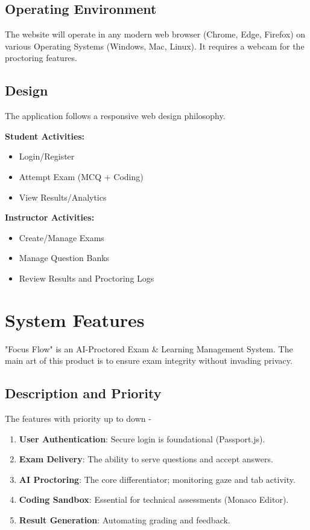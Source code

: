 \documentclass{scrreprt}
\begin{document}
\section{Operating Environment}
The website will operate in any modern web browser (Chrome, Edge, Firefox) on various Operating Systems (Windows, Mac, Linux). It requires a webcam for the proctoring features.

\section{Design}
The application follows a responsive web design philosophy.

\textbf{Student Activities:}
\begin{itemize}
    \item Login/Register
    \item Attempt Exam (MCQ + Coding)
    \item View Results/Analytics
\end{itemize}
\textbf{Instructor Activities:}
\begin{itemize}
    \item Create/Manage Exams
    \item Manage Question Banks
    \item Review Results and Proctoring Logs
\end{itemize}

\chapter{System Features}
"Focus Flow" is an AI-Proctored Exam \& Learning Management System. The main art of this product is to ensure exam integrity without invading privacy.

\section{Description and Priority}
The features with priority up to down -
\begin{enumerate}
    \item \textbf{User Authentication}: Secure login is foundational (Passport.js).
    \item \textbf{Exam Delivery}: The ability to serve questions and accept answers.
    \item \textbf{AI Proctoring}: The core differentiator; monitoring gaze and tab activity.
    \item \textbf{Coding Sandbox}: Essential for technical assessments (Monaco Editor).
    \item \textbf{Result Generation}: Automating grading and feedback.
\end{enumerate}
\end{document}
